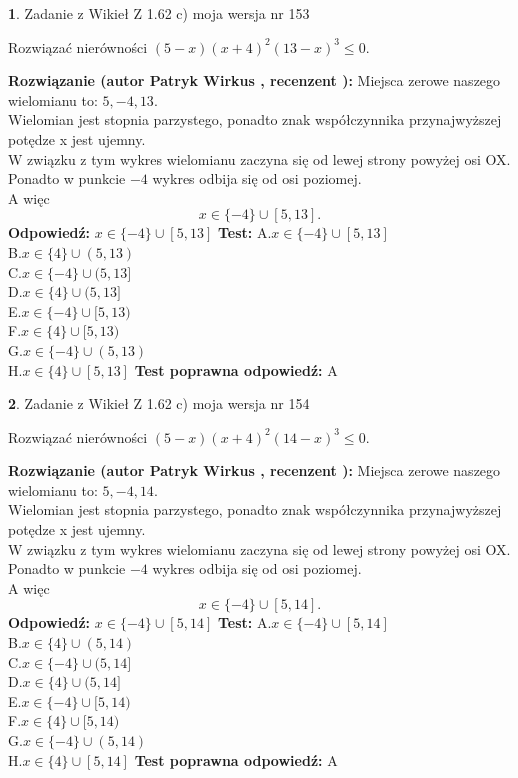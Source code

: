 \documentclass[12pt, a4paper]{article}
\theoremstyle{definition} %
\newtheorem{zad}{}
\newcommand{\zadStart}[1]{\begin{zad}#1\newline}
\newcommand{\zadStop}{\end{zad}}
\newcommand{\rozwStart}[2]{\noindent \textbf{Rozwiązanie (autor #1 , recenzent #2): }\newline}
\newcommand{\rozwStop}{\newline}
\newcommand{\odpStart}{\noindent \textbf{Odpowiedź:}\newline}
\newcommand{\odpStop}{\newline}
\newcommand{\testStart}{\noindent \textbf{Test:}\newline}
\newcommand{\testStop}{\newline}
\newcommand{\kluczStart}{\noindent \textbf{Test poprawna odpowiedź:}\newline}
\newcommand{\kluczStop}{\newline}
\begin{document}
\zadStart{Zadanie z Wikieł Z 1.62 c) moja wersja nr 153}

Rozwiązać nierówności $(5-x)(x+4)^{2}(13-x)^{3}\le0$.
\zadStop
\rozwStart{Patryk Wirkus}{}
Miejsca zerowe naszego wielomianu to: $5, -4, 13$.\\
Wielomian jest stopnia parzystego, ponadto znak współczynnika przy\linebreak najwyższej potędze x jest ujemny.\\ W związku z tym wykres wielomianu zaczyna się od lewej strony powyżej osi OX.\\
Ponadto w punkcie $-4$ wykres odbija się od osi poziomej.\\
A więc $$x \in \{-4\} \cup [5,13].$$
\rozwStop
\odpStart
$x \in \{-4\} \cup [5,13]$
\odpStop
\testStart
A.$x \in \{-4\} \cup [5,13]$\\
B.$x \in \{4\} \cup (5,13)$\\
C.$x \in \{-4\} \cup (5,13]$\\
D.$x \in \{4\} \cup (5,13]$\\
E.$x \in \{-4\} \cup [5,13)$\\
F.$x \in \{4\} \cup [5,13)$\\
G.$x \in \{-4\} \cup (5,13)$\\
H.$x \in \{4\} \cup [5,13]$
\testStop
\kluczStart
A
\kluczStop



\zadStart{Zadanie z Wikieł Z 1.62 c) moja wersja nr 154}

Rozwiązać nierówności $(5-x)(x+4)^{2}(14-x)^{3}\le0$.
\zadStop
\rozwStart{Patryk Wirkus}{}
Miejsca zerowe naszego wielomianu to: $5, -4, 14$.\\
Wielomian jest stopnia parzystego, ponadto znak współczynnika przy\linebreak najwyższej potędze x jest ujemny.\\ W związku z tym wykres wielomianu zaczyna się od lewej strony powyżej osi OX.\\
Ponadto w punkcie $-4$ wykres odbija się od osi poziomej.\\
A więc $$x \in \{-4\} \cup [5,14].$$
\rozwStop
\odpStart
$x \in \{-4\} \cup [5,14]$
\odpStop
\testStart
A.$x \in \{-4\} \cup [5,14]$\\
B.$x \in \{4\} \cup (5,14)$\\
C.$x \in \{-4\} \cup (5,14]$\\
D.$x \in \{4\} \cup (5,14]$\\
E.$x \in \{-4\} \cup [5,14)$\\
F.$x \in \{4\} \cup [5,14)$\\
G.$x \in \{-4\} \cup (5,14)$\\
H.$x \in \{4\} \cup [5,14]$
\testStop
\kluczStart
A
\kluczStop
\end{document}
